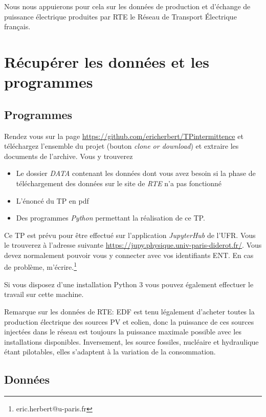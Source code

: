 \documentclass[12pt,a4]{article}
\newcommand{\tmtextit}[1]{{\itshape{#1}}}
\begin{document}
Nous nous appuierons pour cela sur les données de production et d'échange de puissance électrique produites par RTE le Réseau de Transport Électrique français.


\section{Récupérer les données et les programmes}

\subsection{Programmes}

Rendez vous sur la page \newline
\href{https://github.com/ericherbert/TPintermittence}{https://github.com/ericherbert/TPintermittence} et téléchargez l'ensemble du projet (bouton \tmtextit{clone or download}) et extraire les
documents de l'archive. Vous y trouverez
\begin{itemize}
  \item Le dossier \tmtextit{DATA} contenant les données dont vous avez
  besoin si la phase de téléchargement des données sur le site de
  \tmtextit{RTE} n'a pas fonctionné
  
  \item L'énoncé du TP en pdf
  
  \item Des programmes \tmtextit{Python} permettant la réalisation de ce TP.
\end{itemize}
Ce TP est prévu pour être effectué sur l'application \tmtextit{JupyterHub}
de l'UFR. Vous le trouverez à l'adresse suivante
\href{https://jupy.physique.univ-paris-diderot.fr/}{https://jupy.physique.univ-paris-diderot.fr/}. Vous devez normalement pouvoir vous y connecter avec vos identifiants ENT. En
cas de problème, m'écrire.\footnote{eric.herbert@u-paris.fr}

Si vous disposez d'une installation Python 3 vous pouvez également effectuer le travail sur cette machine.

Remarque sur les données de RTE: EDF est tenu légalement d'acheter toutes la
production électrique des sources PV et eolien, donc la puissance de ces sources injectées dans le réseau est toujours la puissance maximale possible avec les installations disponibles. Inversement, les source fossiles, nucléaire et hydraulique étant pilotables, elles s'adaptent à la variation de la consommation.


\subsection{Données}
\end{document}

